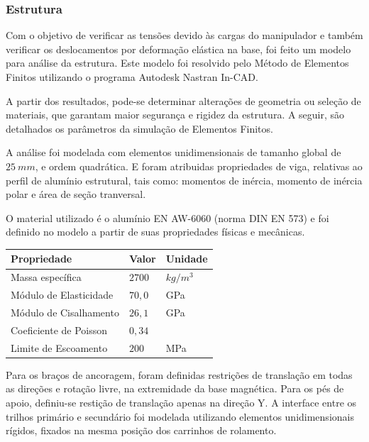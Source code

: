 \subsubsection{Estrutura}

Com o objetivo de verificar as tensões devido às cargas do manipulador e também
verificar os deslocamentos por deformação elástica na base, foi feito um modelo
para análise da estrutura. Este modelo foi resolvido pelo Método de
Elementos Finitos utilizando o programa Autodesk\textregistered{}
Nastran\textregistered{} In-CAD.

A partir dos resultados, pode-se determinar alterações de geometria ou seleção
de materiais, que garantam maior segurança e rigidez da estrutura.
A seguir, são detalhados os parâmetros da simulação de Elementos Finitos.

 A análise foi modelada com elementos unidimensionais
de tamanho global de $25~mm$, e ordem quadrática.  E foram atribuidas propriedades
de viga, relativas ao perfil de alumínio estrutural, tais como:
momentos de inércia, momento de inércia polar e área de seção tranversal.

 O material utilizado é o alumínio EN AW-6060 (norma
DIN EN 573) e foi definido no modelo a partir de suas propriedades físicas e
mecânicas. %

\begin{center}
\centering
\begin{tabular}{|l|l|l|}
\hline
\textbf{Propriedade}   & \textbf{Valor} & \textbf{Unidade}    \\ \hline
Massa específica       & $2700$           & $kg/m^3$          \\ \hline
Módulo de Elasticidade & $70,0$           & GPa               \\ \hline
Módulo de Cisalhamento & $26,1$           & GPa               \\ \hline
Coeficiente de Poisson & $0,34$           &                   \\ \hline
Limite de Escoamento   & $200$            & MPa               \\ \hline
\end{tabular}
\label{tab::prop_material}
\end{center}


 Para os braços de ancoragem, foram
definidas restrições de translação em todas as direções e rotação livre, na
extremidade da base magnética. Para os pés de apoio, definiu-se restição
de translação apenas na direção Y. A interface entre os trilhos primário e
secundário foi modelada utilizando elementos unidimensionais rígidos, fixados na
mesma posição dos carrinhos de rolamento.

